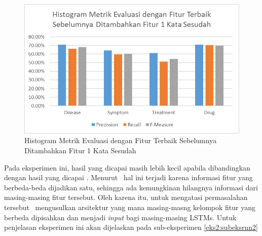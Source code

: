     \begin{figure}
    	\centering
    	\includegraphics[width=\linewidth]{images/histogram8}
    	\caption{Histogram Metrik Evaluasi dengan Fitur Terbaik Sebelumnya Ditambahkan Fitur 1 Kata Sesudah}
    	\label{fig:owndict10}
    \end{figure}
    
    Pada eksperimen ini, hasil yang dicapai masih lebih kecil apabila dibandingkan dengan hasil yang dicapai \cite{skripsiKakRadit}. Menurut \saya~hal ini terjadi karena informasi fitur yang berbeda-beda dijadikan satu, sehingga ada kemungkinan hilangnya informasi dari masing-masing fitur tersebut. Oleh karena itu, untuk mengatasi permasalahan tersebut \saya~mengusulkan arsitektur yang mana masing-masng kelompok fitur yang berbeda dipisahkan dan menjadi \textit{input} bagi masing-masing LSTMs. Untuk penjelasan eksperimen ini akan dijelaskan pada sub-eksperimen \ref{eks2:subeksrnn2}
